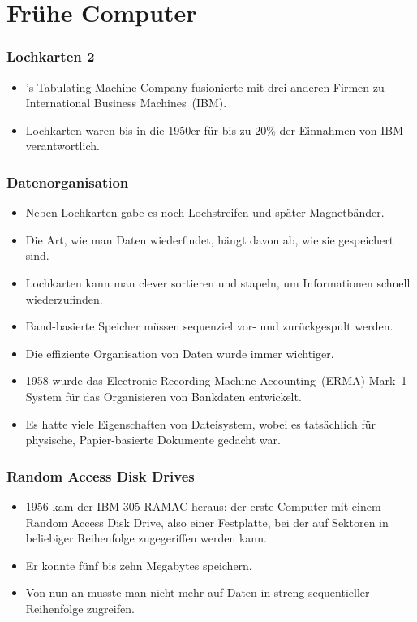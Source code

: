 \documentclass[aspectratio=169,mathserif,notheorems]{beamer}%
\begin{document}
\section{Frühe Computer}%
%
\begin{frame}[t]%
\frametitle{Lochkarten 2}%
\begin{itemize}%
\item \citeauthor{H1884AFCS}'s Tabulating Machine Company fusionierte mit drei anderen Firmen zu International Business Machines~(IBM).%
\item<2-> Lochkarten waren bis in die 1950er für bis zu 20\% der Einnahmen von IBM verantwortlich\cite{ITIPCTPORTTIAOHMOTWD}.%
\end{itemize}%
%
%
\end{frame}%
%
\begin{frame}%
\frametitle{Datenorganisation}%
\begin{itemize}%
\item Neben Lochkarten gabe es noch Lochstreifen und später Magnetbänder.%
\item<2-> Die Art, wie man Daten wiederfindet, hängt davon ab, wie sie gespeichert sind.%
\item<3-> Lochkarten kann man clever sortieren und stapeln, um Informationen schnell wiederzufinden.%
\item<4-> Band-basierte Speicher müssen sequenziel vor- und zurückgespult werden.%
\item<5-> Die effiziente Organisation von Daten wurde immer wichtiger.%
\item<6-> 1958 wurde das Electronic Recording Machine Accounting~(ERMA) Mark~1 System für das Organisieren von Bankdaten entwickelt\cite{BIF1958OARORGIALSEP}.%
\item<6-> Es hatte viele Eigenschaften von Dateisystem, wobei es tatsächlich für physische, Papier-basierte Dokumente gedacht war.%
\end{itemize}%
\end{frame}%
%
\begin{frame}[t]%
\frametitle{Random Access Disk Drives}%
\begin{itemize}%
\item 1956 kam der IBM 305 RAMAC heraus: der erste Computer mit einem Random Access Disk Drive, also einer Festplatte, bei der auf Sektoren in beliebiger Reihenfolge zugegeriffen werden kann\cite{IRTFRADDRHBUCASTSFEFSFTE}.
\item<2-> Er konnte fünf bis zehn Megabytes speichern.%
\item<3-> Von nun an musste man nicht mehr auf Daten in streng sequentieller Reihenfolge zugreifen\cite{C20245YOQ}.%
\end{itemize}%
%
%
\end{frame}%
\end{document}
